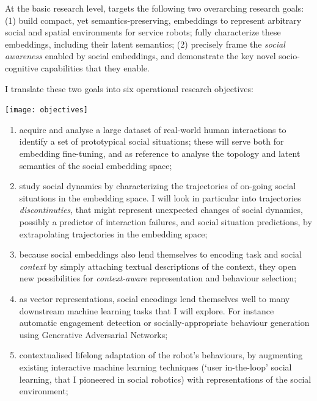 At the basic research level, \project targets the following
two overarching research goals: (1) build compact, yet semantics-preserving,
embeddings to represent arbitrary social and spatial environments for service
robots; fully characterize these embeddings, including their latent semantics;
(2) precisely frame the \emph{social awareness} enabled by social embeddings,
and demonstrate the key novel socio-cognitive capabilities that they enable.

I translate these two goals into six operational research objectives:

\begin{center}
    \texttt{[image: objectives]}
\end{center}

\begin{enumerate}[label=\textbf{O\arabic*}]
    \item \label{T1} acquire and analyse a large dataset of real-world human
        interactions to identify a set of prototypical
        social situations; these will serve both for embedding fine-tuning, and
        as reference to analyse the topology and latent semantics of the social
        embedding space;

    \item \label{T2} study social dynamics by characterizing the trajectories of
        on-going social situations in the embedding space. I will look in
        particular into trajectories \emph{discontinuties}, that might represent
        unexpected changes of social dynamics, possibly a predictor of
        interaction failures, and social situation predictions, by extrapolating
        trajectories in the embedding space;

    \item \label{T5} because social embeddings also lend themselves to encoding
        task and social \emph{context} by simply attaching textual descriptions
        of the context, they open new possibilities for
        \emph{context-aware} representation and behaviour selection;


    \item \label{T3} as vector representations, social encodings lend
        themselves well to many downstream machine learning tasks
        that I will explore. For instance automatic engagement
        detection or socially-appropriate behaviour generation using Generative
        Adversarial Networks;

    \item \label{T4} contextualised lifelong adaptation of the robot's
        behaviours, by augmenting existing interactive machine learning
        techniques (`user in-the-loop' social learning, that I pioneered in
        social robotics\cite{senft2017supervised,
        winkle2020couch,winkle2021leador}) with representations of the social
        environment;


\end{enumerate}
